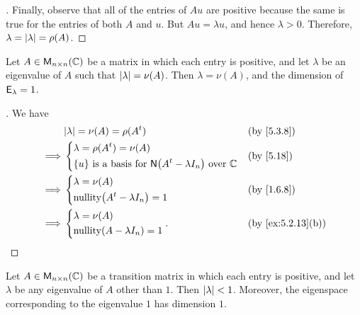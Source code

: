 \begin{proof}[]
  Finally, observe that all of the entries of \(Au\) are positive because the same is true for the entries of both \(A\) and \(u\).
  But \(Au = \lambda u\), and hence \(\lambda > 0\).
  Therefore, \(\lambda = \left\lvert\lambda\right\rvert = \rho(A)\).
\end{proof}

\begin{cor}\label{5.3.13}
  Let \(A \in \ms[n][n][\C]\) be a matrix in which each entry is positive, and let \(\lambda\) be an eigenvalue of \(A\) such that \(\left\lvert\lambda\right\rvert = \nu(A)\).
  Then \(\lambda = \nu(A)\), and the dimension of \(\mathsf{E}_{\lambda} = 1\).
\end{cor}

\begin{proof}[]
  We have
  \begin{align*}
             & \abs{\lambda} = \nu(A) = \rho(\tp{A})                                                       &  & \by{5.3.8} \\
    \implies & \begin{dcases}
                 \lambda = \rho(\tp{A}) = \nu(A) \\
                 \set{u} \text{ is a basis for } \ns{\tp{A} - \lambda I_n} \text{ over } \C
               \end{dcases} &  & \by{5.18}                  \\
    \implies & \begin{dcases}
                 \lambda = \nu(A) \\
                 \nt{\tp{A} - \lambda I_n} = 1
               \end{dcases}                                              &  & \by{1.6.8}                                   \\
    \implies & \begin{dcases}
                 \lambda = \nu(A) \\
                 \nt{A - \lambda I_n} = 1
               \end{dcases}.                                                                    &  & \by{ex:5.2.13}[b]
  \end{align*}
\end{proof}

\begin{cor}\label{5.3.14}
  Let \(A \in \ms[n][n][\C]\) be a transition matrix in which each entry is positive, and let \(\lambda\) be any eigenvalue of \(A\) other than \(1\).
  Then \(\left\lvert\lambda\right\rvert < 1\).
  Moreover, the eigenspace corresponding to the eigenvalue \(1\) has dimension \(1\).
\end{cor}

